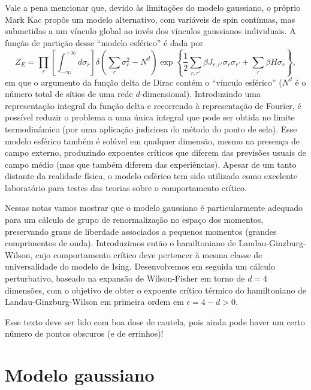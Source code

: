 \documentclass[12pt,a4paper]{article}
\newcounter{corr}
\begin{document}
Vale a pena mencionar que, devido às limitações do modelo gaussiano, o
próprio Mark Kac propôs um modelo alternativo, com variáveis de spin
contínuas, mas submetidas a um vínculo global ao invés dos vínculos gaussianos
individuais. A função de partição desse ``modelo esférico'' é dada por
\begin{equation}
Z_E=\prod_r\left[\int_{-\infty}^{+\infty}d\sigma_r\right]
\delta\left(\sum_r\sigma_r^2-N^d\right)
\exp\left\{\frac12\sum_{r,r'}\beta J_{r,r'}\sigma_r\sigma_{r'}+\sum_r\beta H\sigma_r\right\},
\end{equation}
em que o argumento da função delta de Dirac contém o ``vínculo esférico''
($N^d$ é o número total de sítios de uma rede $d$-dimensional). Introduzindo
uma representação integral da função delta e recorrendo à representação de
Fourier, é possível reduzir o problema a uma única integral que pode ser
obtida no limite termodinâmico (por uma aplicação judiciosa do método do
ponto de sela). Esse modelo esférico também é solúvel em qualquer dimensão,
mesmo na presença de campo externo, produzindo expoentes críticos que
diferem das previsões usuais de campo médio (mas que também diferem das
experiências). Apesar de um tanto distante da realidade física, o modelo
esférico tem sido utilizado como excelente laboratório para testes das teorias
sobre o comportamento crítico.

Nessas notas vamos mostrar que o modelo gaussiano é particularmente
adequado para um cálculo de grupo de renormalização no espaço dos momentos,
preservando graus de liberdade associados a pequenos momentos (grandes
comprimentos de onda). Introduzimos então o hamiltoniano de
Landau-Ginzburg-Wilson, cujo comportamento crítico deve pertencer à mesma classe
de universalidade do modelo de Ising. Desenvolvemos em seguida um cálculo
perturbativo, baseado na expansão de Wilson-Fisher em torno de $d=4$
dimensões, com o objetivo de obter o expoente crítico térmico do hamiltoniano
de Landau-Ginzburg-Wilson em primeira ordem em $\epsilon=4-d>0$.

Esse texto deve ser lido com boa dose de cautela, pois ainda pode haver
um certo número de pontos obscuros (e de errinhos)!

\section{Modelo gaussiano}
\end{document}
